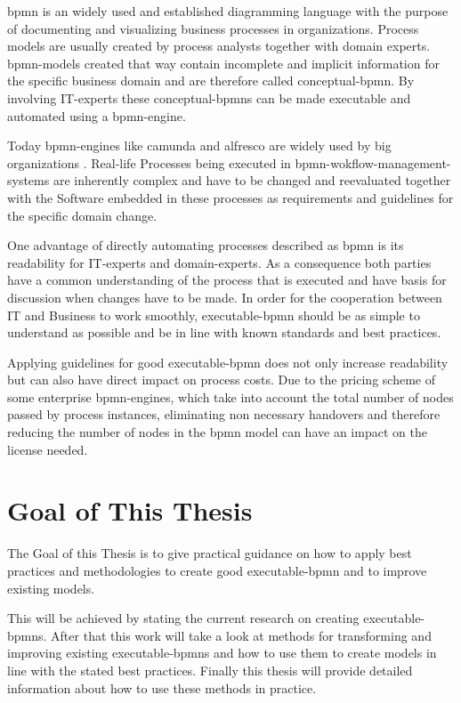\gls{bpmn} is an widely used and established diagramming language with the purpose of documenting and visualizing business processes in organizations. Process models are usually created by process analysts together with domain experts. \gls{bpmn}-models created that way contain incomplete and implicit information for the specific business domain and are therefore called \gls{conceptual-bpmn}. By involving IT-experts these \gls{conceptual-bpmn}s can be made executable and automated using a \gls{bpmn-engine}. \cite{fundamentals}

Today \gls{bpmn-engine}s like \gls{camunda}  and \gls{alfresco} are widely used by big organizations \cite{camunda-customers} \cite{activiti-customers}. Real-life Processes being executed in \gls{bpmn-wokflow-management-system}s are inherently complex and have to be changed and reevaluated together with the Software embedded in these processes as requirements and guidelines for the specific domain change. 

One advantage of directly automating processes described as \gls{bpmn} is its readability for IT-experts and domain-experts. As a consequence both parties have a common understanding of the process that is executed and have basis for discussion when changes have to be made. In order for the cooperation between IT and Business to work smoothly, \gls{executable-bpmn} should be as simple to understand as possible and be in line with known standards and best practices. 

Applying guidelines for good \gls{executable-bpmn} does not only increase readability but can also have direct impact on process costs. Due to the pricing scheme of some enterprise \gls{bpmn-engine}s, which take into account the total number of nodes passed by process instances, eliminating non necessary handovers and therefore reducing the number of nodes in the \gls{bpmn} model can have an impact on the license needed. 

\section{Goal of This Thesis}
The Goal of this Thesis is to give practical guidance on how to apply best practices and methodologies to create good \gls{executable-bpmn} and to improve existing models. 

This will be achieved by stating the current research on creating  \gls{executable-bpmn}s. After that this work will take a look at methods for transforming and improving existing \gls{executable-bpmn}s and how to use them to create models in line with the stated best practices. Finally this thesis will provide detailed information about how to use these methods in practice. 

